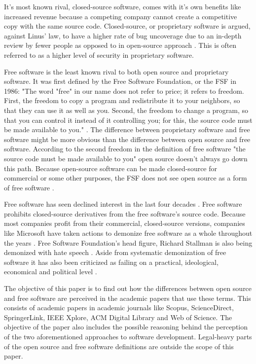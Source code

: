\documentclass[conference]{IEEEtran}
\begin{document}
It's most known rival, closed-source software, comes with it's own benefits like increased revenue because a competing company cannot create a competitive copy with the same source code. Closed-source, or proprietary software is argued, against Linus' law, to have a higher rate of bug uncoverage due to an in-depth review by fewer people as opposed to in open-source approach \cite{leblanc2002writing}. This is often referred to as a higher level of security in proprietary software.

Free software is the least known rival to both open source and proprietary software. It was first defined by the Free Software Foundation, or the FSF in 1986: "The word "free" in our name does not refer to price; it refers to freedom.  First, the freedom to copy a program and redistribute it to your neighbors, so that they can use it as well as you.  Second, the freedom to change a program, so that you can control it instead of it controlling you; for this, the source code must be made available to you." \cite{bull1}. The difference between proprietary software and free software might be more obvious than the difference between open source and free software. According to the second freedom in the definition of free software "the source code must be made available to you" open source doesn't always go down this path. Because open-source software can be made closed-source for commercial or some other purposes, the FSF does not see open source as a form of free software \cite{stallman2002free}.

Free software has seen declined interest in the last four decades \cite{declinewiki}. Free software prohibits closed-source derivatives from the free software's source code. Because most companies profit from their commercial, closed-source versions, companies like Microsoft have taken actions to demonize free software as a whole throughout the years \cite{mundie}. Free Software Foundation's head figure, Richard Stallman is also being demonized with hate speech \cite{supportrms}. Aside from systematic demonization of free software it has also been criticized as failing on a practical, ideological, economical and political level \cite{critfree}.

The objective of this paper is to find out how the differences between open source and free software are perceived in the academic papers that use these terms. This consists of academic papers in academic journals like Scopus, ScienceDirect, SpringerLink, IEEE Xplore, ACM Digital Library and Web of Science. The objective of the paper also includes the possible reasoning behind the perception of the two aforementioned approaches to software development. Legal-heavy parts of the open source and free software definitions are outside the scope of this paper.
\end{document}
